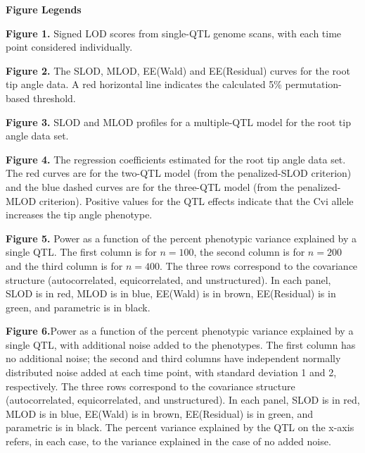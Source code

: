 \documentclass[12pt,letterpaper]{article}
\newenvironment{hanging}
{\begin{list}{}
        {\setlength{\labelwidth}{0in}
         \setlength{\leftmargin}{1em}
         \setlength{\itemindent}{-1em}
        }
}
{\end{list}}
\begin{document}
\centerline{\sffamily \textbf{Figure Legends}}

\begin{hanging}

\item \textbf{Figure 1.}
Signed LOD scores from single-QTL genome scans, with each time point
considered individually.

\item \textbf{Figure 2.}
The SLOD, MLOD, EE(Wald) and EE(Residual) curves for the root tip
angle data. A red horizontal line indicates the calculated 5\%
permutation-based threshold.

\item \textbf{Figure 3.}
SLOD and MLOD profiles for a multiple-QTL model for the root tip angle data set.

\item \textbf{Figure 4.}
The regression coefficients estimated for the root tip angle data set. The
red curves are for the two-QTL model (from the penalized-SLOD
criterion) and the blue dashed curves are for the three-QTL model
(from the penalized-MLOD criterion).  Positive values for the QTL
effects indicate that the Cvi allele increases the tip angle
phenotype.

\item \textbf{Figure 5.}
Power as a function of the percent phenotypic
  variance explained by a single QTL. The first column is for $n=100$, the second column is for $n=200$ and the third column is for $n=400$. The three rows correspond to the
  covariance structure (autocorrelated, equicorrelated, and
  unstructured).  In each panel, SLOD is in red, MLOD is in blue,
  EE(Wald) is in brown, EE(Residual) is in green, and parametric is in
  black.

\item \textbf{Figure 6.}Power as a function of the percent phenotypic variance explained by
  a single QTL, with additional noise added to the phenotypes.  The
  first column has no additional noise; the second and third columns
  have independent normally distributed noise added at each time
  point, with standard deviation 1 and 2, respectively.  The three
  rows correspond to the covariance structure (autocorrelated,
  equicorrelated, and unstructured).  In each panel, SLOD is in red,
  MLOD is in blue, EE(Wald) is in brown, EE(Residual) is in green, and
  parametric is in black.  The percent variance explained by the QTL
  on the x-axis refers, in each case, to the variance explained in the
  case of no added noise.
\end{hanging}
\end{document}
